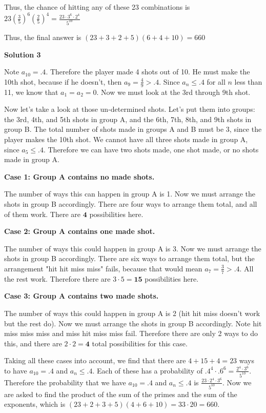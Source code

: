 \begin{enumerate}
 Thus, the chance of hitting any of these 23 combinations is $23\left(\frac{3}{5}\right)^6\left(\frac{2}{5}\right)^4 = \frac{23\cdot3^6\cdot2^4}{5^{10}}$

 Thus, the final answer is $(23+3+2+5)(6+4+10)=\boxed{660}$




\textbf{Solution 3}

Note $a_{10}=.4$. Therefore the player made 4 shots out of 10. He must make the 10th shot, because if he doesn't, then $a_9=\frac{4}{9}>.4$. Since $a_n\leq .4$ for all $n$ less than 11, we know that $a_1=a_2=0$. Now we must look at the 3rd through 9th shot.

 Now let's take a look at those un-determined shots. Let's put them into groups: the 3rd, 4th, and 5th shots in group A, and the 6th, 7th, 8th, and 9th shots in group B. The total number of shots made in groups A and B must be 3, since the player makes the 10th shot. We cannot have all three shots made in group A, since $a_5\leq .4$. Therefore we can have two shots made, one shot made, or no shots made in group A.

 \textbf{Case 1: Group A contains no made shots.}

 The number of ways this can happen in group A is 1. Now we must arrange the shots in group B accordingly. There are four ways to arrange them total, and all of them work. There are $\textbf{4}$ possibilities here.

 \textbf{Case 2: Group A contains one made shot.}

 The number of ways this could happen in group A is 3.  Now we must arrange the shots in group B accordingly. There are six ways to arrange them total, but the arrangement "hit hit miss miss" fails, because that would mean $a_7=\frac{3}{7}>.4$. All the rest work. Therefore there are $3\cdot5=\textbf{15}$ possibilities here.

 \textbf{Case 3: Group A contains two made shots.}

 The number of ways this could happen in group A is 2 (hit hit miss doesn't work but the rest do). Now we must arrange the shots in group B accordingly. Note hit miss miss miss and miss hit miss miss fail. Therefore there are only 2 ways to do this, and there are $2\cdot 2=\textbf{4}$ total possibilities for this case.

 
Taking all these cases into account, we find that there are $4+15+4=23$ ways to have $a_{10} = .4$ and $a_n\leq .4$. Each of these has a probability of $.4^4\cdot.6^6=\frac{2^4\cdot 3^6}{5^{10}}$. Therefore the probability that we have $a_{10} = .4$ and $a_n\leq .4$ is $\frac{23\cdot2^4\cdot3^6}{5^{10}}$. Now we are asked to find the product of the sum of the primes and the sum of the exponents, which is $(23+2+3+5)(4+6+10)=33\cdot20=\boxed{660}$.


\end{enumerate}
